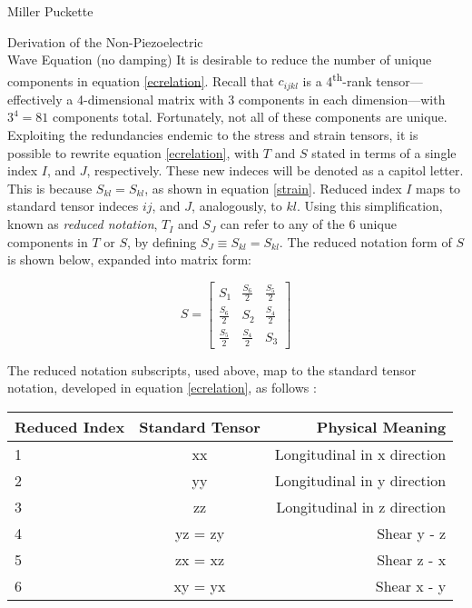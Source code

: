 \documentclass[a4paper,10pt]{report}
\numberwithin{equation}{section}
\begin{document}
\begin{chapter}{Miller Puckette}
\begin{section}{Derivation of the Non-Piezoelectric \\ Wave Equation (no damping)}
It is desirable to reduce the number of unique components in equation
\eqref{ecrelation}. Recall that $c_{ijkl}$ is a 4\textsuperscript{th}-rank
tensor---effectively a 4-dimensional matrix with 3 components in each dimension---with $3^4 = 81$ components total. Fortunately, not all of these components are unique. Exploiting the redundancies endemic to the stress and strain tensors, it is
possible to rewrite equation \eqref{ecrelation}, with $T$ and $S$ stated in terms 
of a single index $I$, and $J$, respectively. These new indeces will be denoted as a capitol letter. This is because $S_{kl} =
S_{kl}$, as shown in equation \eqref{strain}. Reduced index $I$ maps to standard tensor indeces $ij$, and $J$, analogously, to $kl$. 
Using this simplification, known as \emph{reduced notation}, $T_I$ and $S_J$ can refer
to any of the 6 unique components in $T$ or $S$, by defining $S_{J} \equiv
S_{kl} = S_{kl}$. The reduced notation form of $S$ is shown below, expanded into matrix form\cite[p.~542]{Kino1987}:
\begin{singlespace}
\begin{equation}
 S = \begin{bmatrix}
      S_{1} & \frac{S_{6}}{2} & \frac{S_{5}}{2} \\[0.5em]
      \frac{S_{6}}{2} & S_{2} & \frac{S_{4}}{2} \\[0.5em]
      \frac{S_{5}}{2} & \frac{S_{4}}{2} & S_{3}
     \end{bmatrix}
\end{equation}
\end{singlespace}
The reduced notation subscripts, used above, map to the standard tensor notation, developed in equation \eqref{ecrelation}, as follows\cite[p.~17]{Ballantine1997} \cite[p.~543]{Kino1987}:
\begin{singlespace}
\begin{tabular}{l | c | r}
\hline
Reduced Index & Standard Tensor & Physical Meaning\\
\hline
1 & xx & Longitudinal in x direction\\
2 & yy & Longitudinal in y direction\\
3 & zz & Longitudinal in z direction\\
4 & yz = zy & Shear y - z\\
5 & zx = xz & Shear z - x\\
6 & xy = yx & Shear x - y
\label{tab:tensor}
\end{tabular}
{}\\
{}\\
\end{singlespace}

\end{section}
\end{chapter}
\end{document}
